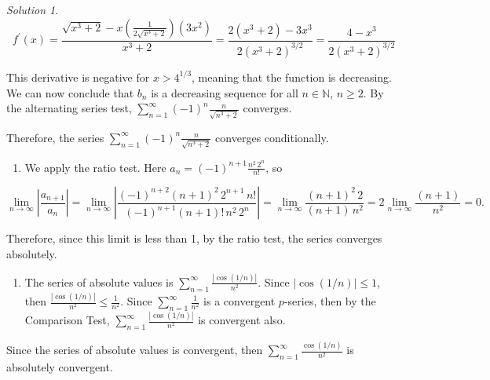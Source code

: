 \documentclass[
]{book}
\providecommand{\tightlist}{%
  \setlength{\itemsep}{0pt}\setlength{\parskip}{0pt}}
\theoremstyle{definition}
\theoremstyle{definition}
\theoremstyle{definition}
\theoremstyle{definition}
\theoremstyle{remark}
\newtheorem*{solution}{Solution}
\begin{document}
\begin{solution}
\[
    f^\prime(x) = \frac{\sqrt{x^3+2} - x\left(\frac{1}{2\sqrt{x^3+2}}\right)(3x^2)}{x^3+2} = \frac{2(x^3+2) - 3x^3}{2(x^3+2)^{3/2}} = \frac{4-x^3}{2(x^3+2)^{3/2}}
\]

This derivative is negative for \(x>4^{1/3}\), meaning that the function is decreasing. We can now conclude that \(b_n\) is a decreasing sequence for all \(n\in\mathbb N\), \(n\ge 2\). By the alternating series test, \(\displaystyle{\sum_{n=1}^\infty(-1)^{n} \frac{n}{\sqrt{n^3+2}}}\) converges.

Therefore, the series \(\displaystyle{\sum_{n=1}^\infty(-1)^{n} \frac{n}{\sqrt{n^3+2}}}\) converges conditionally.

\begin{enumerate}
\def\labelenumi{\arabic{enumi}.}
\setcounter{enumi}{3}
\tightlist
\item
  We apply the ratio test. Here \(a_n = (-1)^{n+1}\frac{n^2\, 2^n}{n!}\), so
\end{enumerate}

\[
    \lim_{n\to\infty}\left|\frac{a_{n+1}}{a_n}\right| = \lim_{n\to\infty}\left|\frac{(-1)^{n+2}(n+1)^2\,2^{n+1}\,n!}{(-1)^{n+1}(n+1)!\,n^2\,2^n}\right|  =  \lim_{n\to\infty}\frac{(n+1)^2\,2}{(n+1)\,n^2} = 2\lim_{n\to\infty}\frac{(n+1)}{n^2} = 0.
\]

Therefore, since this limit is less than 1, by the ratio test, the series converges absolutely.

\begin{enumerate}
\def\labelenumi{\arabic{enumi}.}
\setcounter{enumi}{4}
\tightlist
\item
  The series of absolute values is \(\displaystyle \sum_{n=1}^{\infty} \frac{|\cos(1/n)|}{n^2}\). Since \(|\cos(1/n)| \le 1\), then \(\frac{|\cos(1/n)|}{n^2} \le \frac{1}{n^2}\). Since \(\displaystyle \sum_{n=1}^{\infty} \frac{1}{n^2}\) is a convergent \(p\)-series, then by the Comparison Test, \(\displaystyle \sum_{n=1}^{\infty} \frac{|\cos(1/n)|}{n^2}\) is convergent also.
\end{enumerate}

Since the series of absolute values is convergent, then \(\displaystyle \sum_{n=1}^{\infty} \frac{\cos(1/n)}{n^2}\) is absolutely convergent.

\end{solution}

  
\end{document}
